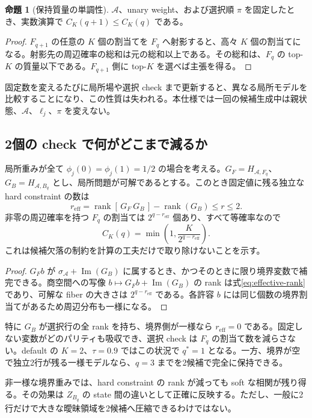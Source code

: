 \documentclass[a4paper,11pt]{ltjsarticle}
\numberwithin{equation}{section}
\theoremstyle{definition}
\newtheorem{proposition}[definition]{命題}
\newcommand{\A}{\mathcal A}
\newcommand{\rank}{\operatorname{rank}}
\newcommand{\im}{\operatorname{Im}}
\begin{document}
\begin{proposition}[保持質量の単調性]
$\A$、unary weight、および選択順 $\pi$ を固定したとき、実数演算で $C_K(q+1)\le C_K(q)$ である。
\end{proposition}
\begin{proof}
$F_{q+1}$ の任意の $K$ 個の割当てを $F_q$ へ射影すると、高々 $K$ 個の割当てになる。射影先の周辺確率の総和は元の総和以上である。その総和は、$F_q$ の top-$K$ の質量以下である。$F_{q+1}$ 側に top-$K$ を選べば主張を得る。
\end{proof}

固定数を変えるたびに局所場や選択 check まで更新すると、異なる局所モデルを比較することになり、この性質は失われる。本仕様では一回の候補生成中は親状態、$\A$、$\ell_j$、$\pi$ を変えない。

\subsection{2個の check で何がどこまで減るか}
局所重みが全て $\phi_j(0)=\phi_j(1)=1/2$ の場合を考える。$G_F=H_{\A,F_q}$、$G_B=H_{\A,B_q}$ とし、局所問題が可解であるとする。このとき固定値に残る独立な hard constraint の数は
\begin{equation}
 r_{\mathrm{eff}}=
 \rank[\,G_F\ G_B\,]-\rank(G_B)\le r\le2.
 \label{eq:effective-rank}
\end{equation}
非零の周辺確率を持つ $F_q$ の割当ては $2^{q-r_{\mathrm{eff}}}$ 個あり、すべて等確率なので
\begin{equation}
 C_K(q)=\min\left(1,\frac{K}{2^{q-r_{\mathrm{eff}}}}\right).
 \label{eq:uniform-coverage}
\end{equation}
これは候補欠落の制約を計算の工夫だけで取り除けないことを示す。

\begin{proof}
$G_Fb$ が $\sigma_\A+\im(G_B)$ に属するとき、かつそのときに限り境界変数で補完できる。商空間への写像 $b\mapsto G_Fb+\im(G_B)$ の rank は式\eqref{eq:effective-rank}であり、可解な fiber の大きさは $2^{q-r_{\mathrm{eff}}}$ である。各許容 $b$ には同じ個数の境界割当てがあるため周辺分布も一様になる。
\end{proof}

特に $G_B$ が選択行の全 rank を持ち、境界側が一様なら $r_{\mathrm{eff}}=0$ である。固定しない変数がどのパリティも吸収でき、選択 check は $F_q$ の割当て数を減らさない。default の $K=2$、$\tau=0.9$ ではこの状況で $q^*=1$ となる。一方、境界が空で独立2行が残る一様モデルなら、$q=3$ までを2候補で完全に保持できる。

非一様な境界重みでは、hard constraint の rank が減っても soft な相関が残り得る。その効果は $Z_{B_q}$ の state 間の違いとして正確に反映する。ただし、一般に2行だけで大きな曖昧領域を2候補へ圧縮できるわけではない。
\end{document}
